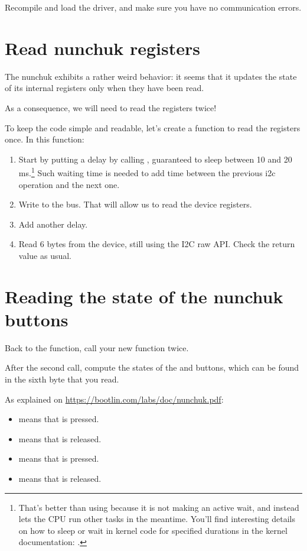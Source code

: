 Recompile and load the driver, and make sure you have no communication
errors.

\section{Read nunchuk registers}

The nunchuk exhibits a rather weird behavior: it seems that it updates
the state of its internal registers only when they have been read.

As a consequence, we will need to read the registers twice!

To keep the code simple and readable, let's create a
 function to read the registers once.
In this function:

\begin{enumerate}
\item Start by putting a  delay by calling
      , guaranteed to sleep between 10 and 20
      ms.\footnote{That's better than using  because it is not making
      an active wait, and instead lets the CPU run other tasks in the meantime.
      You'll find interesting details on how to sleep or wait in kernel
      code for specified durations in the kernel documentation:
      .}
      Such waiting time is needed to add time between the previous i2c
      operation and the next one.
\item Write  to the bus. That will allow us to read
      the device registers.
\item Add another  delay.
\item Read 6 bytes from the device, still using the I2C raw API.
      Check the return value as usual.
\end{enumerate}

\section{Reading the state of the nunchuk buttons}

Back to the  function, call your new function twice.

After the second call, compute the states of the  and 
buttons, which can be found in the sixth byte that you read.

As explained on
\url{https://bootlin.com/labs/doc/nunchuk.pdf}:

\begin{itemize}
\item {} means that  is pressed.
\item {} means that  is released.
\item {} means that  is pressed.
\item {} means that  is released.
\end{itemize}

